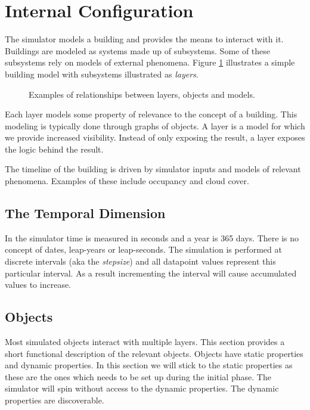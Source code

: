 \documentclass[10pt]{article}
\newcommand{\includeSVG}[1]{
  \texttt{[image: figs/\#1.pdf]}
}
\begin{document}
\section{Internal Configuration}
\label{sec:internals}

The simulator models a building and provides the means to interact with it. Buildings are modeled as systems made up of subsystems. Some of these subsystems rely on models of external phenomena. Figure \ref{fig:layers} illustrates a simple building model with subsystems illustrated as \textsl{layers}.

\begin{figure}[htb]
  \begin{center}
    \rotatebox{0}{\scalebox{0.38}{\includeSVG{layers}}}
  \end{center}
  \caption{Examples of relationships between layers, objects and models.}
  \label{fig:layers}
\end{figure}

Each layer models some property of relevance to the concept of a building. This modeling is typically done through graphs of objects. A layer is a model for which we provide increased visibility. Instead of only exposing the result, a layer exposes the logic behind the result.


The timeline of the building is driven by simulator inputs and models of relevant phenomena. Examples of these include occupancy and cloud cover.

\subsection{The Temporal Dimension}

In the simulator time is measured in seconds and a year is 365 days. There is no concept of dates, leap-years or leap-seconds. The simulation is performed at discrete intervals (aka the \textsl{stepsize}) and all datapoint values represent this particular interval. As a result incrementing the interval will cause accumulated values to increase.

\subsection{Objects}

Most simulated objects interact with multiple layers. This section provides a short functional description of the relevant objects. Objects have static properties and dynamic properties. In this section we will stick to the static properties as these are the ones which needs to be set up during the initial phase. The simulator will spin without access to the dynamic properties. The dynamic properties are discoverable.
\end{document}
